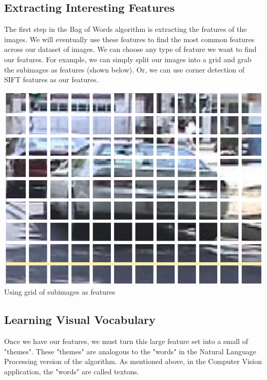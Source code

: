 \documentclass{article}
\begin{document}
\subsection{Extracting Interesting Features}
The first step in the Bag of Words algorithm is extracting the features of the images. We will eventually use these features to find the most common features across our dataset of images. We can choose any type of feature we want to find our features. For example, we can simply split our images into a grid and grab the subimages as features (shown below). Or, we can use corner detection of SIFT features as our features.
\begin{center}
\includegraphics[scale=0.5]{grid_features.png}\\
Using grid of subimages as features \cite{slides}
\end{center}

\subsection{Learning Visual Vocabulary}
Once we have our features, we must turn this large feature set into a small of "themes". These "themes" are analogous to the "words" in the Natural Language Processing version of the algorithm. As mentioned above, in the Computer Vision application, the "words" are called textons.
\end{document}
